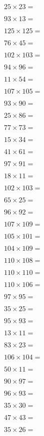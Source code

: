 \documentclass{numbersense}
\begin{document}
\begin{questions}
\q[575] $25 \times 23 = $\ans

\q[1209] $93 \times 13 = $\ans

\q[15625] $125 \times 125 = $\ans

\q[3420] $76 \times 45 = $\ans

\q[10506] $102 \times 103 = $\ans

\q[9024] $94 \times 96 = $\ans

\q[594] $11 \times 54 = $\ans

\q[11235] $107 \times 105 = $\ans

\q[8370] $93 \times 90 = $\ans

\q[2150] $25 \times 86 = $\ans

\q[5621] $77 \times 73 = $\ans

\q[510] $15 \times 34 = $\ans

\q[2501] $41 \times 61 = $\ans

\q[8827] $97 \times 91 = $\ans

\q[198] $18 \times 11 = $\ans

\q[10506] $102 \times 103 = $\ans

\q[1625] $65 \times 25 = $\ans

\q[8832] $96 \times 92 = $\ans

\q[11663] $107 \times 109 = $\ans

\q[10605] $105 \times 101 = $\ans

\q[11336] $104 \times 109 = $\ans

\q[11880] $110 \times 108 = $\ans

\q[12100] $110 \times 110 = $\ans

\q[11660] $110 \times 106 = $\ans

\q[9215] $97 \times 95 = $\ans

\q[875] $35 \times 25 = $\ans

\q[8835] $95 \times 93 = $\ans

\q[143] $13 \times 11 = $\ans

\q[1909] $83 \times 23 = $\ans

\q[11024] $106 \times 104 = $\ans

\q[550] $50 \times 11 = $\ans

\q[8730] $90 \times 97 = $\ans

\q[8928] $96 \times 93 = $\ans

\q[1050] $35 \times 30 = $\ans

\q[2021] $47 \times 43 = $\ans

\q[910] $35 \times 26 = $\ans


\end{questions}
\end{document}

